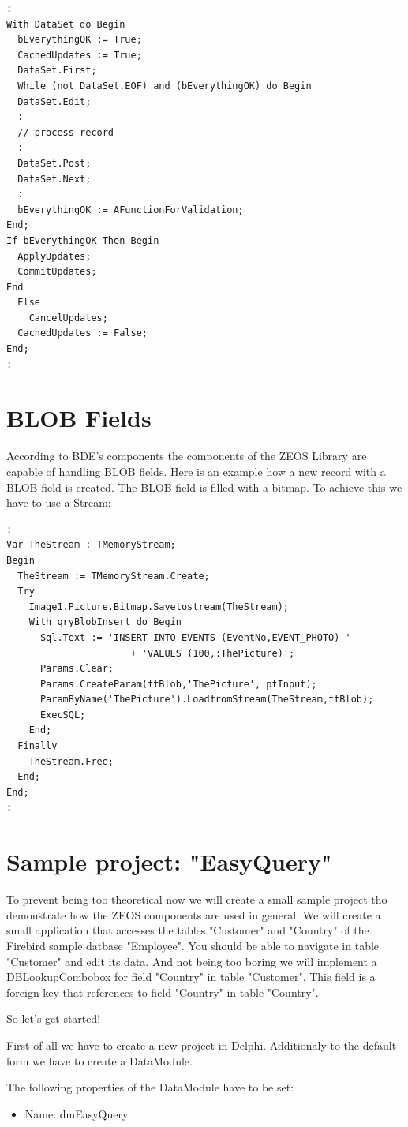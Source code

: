 \documentclass[a4paper,12pt,oneside]{book}
\begin{document}
\begin{verbatim}
:
With DataSet do Begin
  bEverythingOK := True;
  CachedUpdates := True;
  DataSet.First;
  While (not DataSet.EOF) and (bEverythingOK) do Begin
  DataSet.Edit;
  :
  // process record
  :
  DataSet.Post;
  DataSet.Next;
  :
  bEverythingOK := AFunctionForValidation;
End;
If bEverythingOK Then Begin
  ApplyUpdates;
  CommitUpdates;
End
  Else
    CancelUpdates;
  CachedUpdates := False;
End;
:
\end{verbatim}
\section{BLOB Fields}
According to BDE's components the components of the ZEOS Library are capable of handling BLOB fields.
Here is an example how a new record with a BLOB field is created.
The BLOB field is filled with a bitmap.
To achieve this we have to use a Stream:
\begin{verbatim}
:
Var TheStream : TMemoryStream;
Begin
  TheStream := TMemoryStream.Create;
  Try
    Image1.Picture.Bitmap.Savetostream(TheStream);
    With qryBlobInsert do Begin
      Sql.Text := 'INSERT INTO EVENTS (EventNo,EVENT_PHOTO) ' 
			          + 'VALUES (100,:ThePicture)';
      Params.Clear;
      Params.CreateParam(ftBlob,'ThePicture', ptInput);
      ParamByName('ThePicture').LoadfromStream(TheStream,ftBlob);
      ExecSQL;
    End;
  Finally
    TheStream.Free;
  End;
End;
:
\end{verbatim}

\section{Sample project: "EasyQuery"}
To prevent being too theoretical now we will create a small sample project tho demonstrate how the ZEOS components are used in general.
We will create a small application that accesses the tables "Customer" and "Country" of the Firebird sample datbase "Employee".
You should be able to navigate in table "Customer" and edit its data.
And not being too boring we will implement a DBLookupCombobox for field "Country" in table "Customer".
This field is a foreign key that references to field "Country" in table "Country".

So let's get started!

First of all we have to create a new project in Delphi.
Additionaly to the default form we have to create a DataModule.

The following properties of the DataModule have to be set:
\begin{itemize}
\item Name: dmEasyQuery
\end{itemize}
\end{document}
